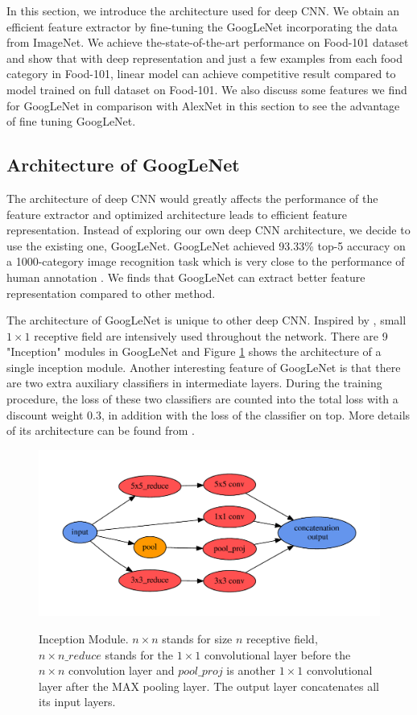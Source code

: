 ﻿In this section, we introduce the architecture used for deep CNN. We obtain an efficient feature extractor by fine-tuning the GoogLeNet incorporating the data from ImageNet. We achieve the-state-of-the-art performance on Food-101 dataset and show that with deep representation and just a few examples from each food category in Food-101, linear model can achieve competitive result compared to model trained on full dataset on Food-101. We also discuss some features we find for GoogLeNet in comparison with AlexNet \cite{krizhevsky2012imagenet} in this section to see the advantage of fine tuning GoogLeNet.
\subsection{Architecture of GoogLeNet}
The architecture of deep CNN would greatly affects the performance of the feature extractor and optimized architecture leads to efficient feature representation.
Instead of exploring our own deep CNN architecture, we decide to use the existing one, GoogLeNet. GoogLeNet achieved 93.33\% top-5 accuracy on a 1000-category image recognition task which is very close to the performance of human annotation \cite{szegedy2014going}. We finds that GoogLeNet can extract better feature representation compared to other method.

 The architecture of GoogLeNet is unique to other deep CNN. Inspired by \cite{linNiN}, small $1\times 1$ receptive field are intensively used throughout the network. There are 9 "Inception" modules in GoogLeNet and Figure \ref{incept} shows the architecture of a single inception module. Another interesting feature of GoogLeNet is that there are two extra auxiliary classifiers in intermediate layers. During the training procedure, the loss of these two classifiers are counted into the total loss with a discount weight 0.3, in addition with the loss of the classifier on top. More details of its architecture can be found from \cite{szegedy2014going}.

\begin{figure}
  \centering
  \includegraphics[scale=.45]{fig/inception.pdf}\\
  \caption{Inception Module. $n\times n$ stands for size $n$ receptive field, $n\times n\_reduce$ stands for the $1\times 1$ convolutional layer before the $n\times n$ convolution layer and $pool\_proj$ is another $1\times 1$ convolutional layer after the MAX pooling layer. The output layer concatenates all its input layers.}\label{incept}
\end{figure}

